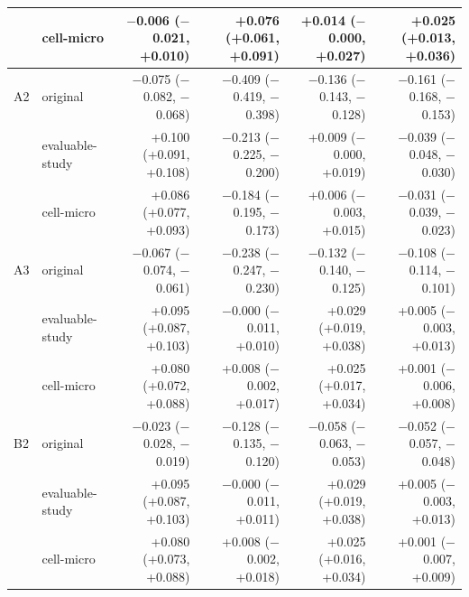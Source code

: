 \begin{longtable}{llrrrr}
 & cell-micro & $-$0.006 ($-$0.021, +0.010) & +0.076 (+0.061, +0.091) & +0.014 ($-$0.000, +0.027) & +0.025 (+0.013, +0.036)\\
\midrule
A2 & original & $-$0.075 ($-$0.082, $-$0.068) & $-$0.409 ($-$0.419, $-$0.398) & $-$0.136 ($-$0.143, $-$0.128) & $-$0.161 ($-$0.168, $-$0.153)\\
 & evaluable-study & +0.100 (+0.091, +0.108) & $-$0.213 ($-$0.225, $-$0.200) & +0.009 ($-$0.000, +0.019) & $-$0.039 ($-$0.048, $-$0.030)\\
 & cell-micro & +0.086 (+0.077, +0.093) & $-$0.184 ($-$0.195, $-$0.173) & +0.006 ($-$0.003, +0.015) & $-$0.031 ($-$0.039, $-$0.023)\\
\midrule
A3 & original & $-$0.067 ($-$0.074, $-$0.061) & $-$0.238 ($-$0.247, $-$0.230) & $-$0.132 ($-$0.140, $-$0.125) & $-$0.108 ($-$0.114, $-$0.101)\\
 & evaluable-study & +0.095 (+0.087, +0.103) & $-$0.000 ($-$0.011, +0.010) & +0.029 (+0.019, +0.038) & +0.005 ($-$0.003, +0.013)\\
 & cell-micro & +0.080 (+0.072, +0.088) & +0.008 ($-$0.002, +0.017) & +0.025 (+0.017, +0.034) & +0.001 ($-$0.006, +0.008)\\
\midrule
B2 & original & $-$0.023 ($-$0.028, $-$0.019) & $-$0.128 ($-$0.135, $-$0.120) & $-$0.058 ($-$0.063, $-$0.053) & $-$0.052 ($-$0.057, $-$0.048)\\
 & evaluable-study & +0.095 (+0.087, +0.103) & $-$0.000 ($-$0.011, +0.011) & +0.029 (+0.019, +0.038) & +0.005 ($-$0.003, +0.013)\\
 & cell-micro & +0.080 (+0.073, +0.088) & +0.008 ($-$0.002, +0.018) & +0.025 (+0.016, +0.034) & +0.001 ($-$0.007, +0.009)\\
\bottomrule
\end{longtable}
